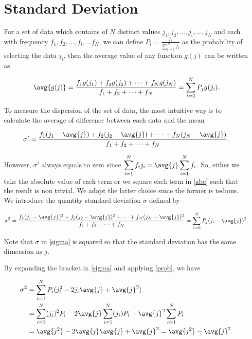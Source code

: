 \documentclass[english,a4paper,12pt]{report}
\begin{document}
\section{Standard Deviation}

For a set of data which contains of \(N\) distinct values \(j_1, j_2, \ldots , j_i, \ldots , j_N\) and each with frequency \(f_1, f_2, \ldots , f_i, \ldots f_N\), we can define \(\displaystyle P_i = \frac{f_i}{\sum_{i=1}^{N} f_i}\) as the probability of selecting the data \(j_i\), then the average value of any function \(g(j)\) can be written as 
	
\begin{equation}
	 \avg{g(j)}  = \frac{f_1 g(j_1) + f_2 g(j_2) + \cdots + f_N g(j_N)}{f_1 + f_2 + \cdots + f_N} = \sum_{i=0}^{N} P_j g(j_i). \label{prob} 
\end{equation}
	
To measure the dispersion of the set of data, the most intuitive way is to calculate the average of difference between each data and the mean

\begin{equation} 
	\sigma' = \frac{f_1(j_1 - \avg{ j }) + f_2(j_2 - \avg{ j }) + \cdots + f_N(j_N - \avg{ j })}{f_1 + f_2 + \cdots + f_N}. \label{abc} 
\end{equation}

However, \(\sigma'\) always equals to zero since \(\displaystyle \sum_{i=1}^{N} f_i j_i = \avg{ j } \sum_{i=1}^{N} f_i \). So, either we take the absolute value of each term or we square each term in \cref{abc} such that the result is non trivial. We adopt the latter choice since the former is tedious. We introduce the quantity standard deviation \(\sigma\) defined by

\begin{equation} 
	\sigma^2 = \frac{f_1(j_1 - \avg{ j })^2 + f_2(j_2 - \avg{ j })^2 + \cdots + f_N(j_N - \avg{ j })^2}{f_1 + f_2 + \cdots + f_N} = \sum_{i=0}^{N} P_j (j_i - \avg{ j })^2. \label{sigma} 
\end{equation}

Note that \(\sigma\) in \cref{sigma} is squared so that the standard deviation has the same dimension as \(j\).

By expanding the bracket in \cref{sigma} and applying \cref{prob}, we have

\begin{equation} 
	\begin{aligned} 
		\sigma^2 &= \sum_{i=1}^{N} P_i (j_i^2 - 2j_i\avg{ j } + \avg{ j }^2) \\ &= \sum_{i=1}^{N} (j_i)^2 P_i - 2 \avg{ j } \sum_{i=1}^{N} (j_i) P_i + \avg{ j }^2 \sum_{i=1}^{N} P_i \\ &= \avg{ j^2 } - 2\avg{ j } \avg{ j } + \avg{ j }^2 = \avg{ j^2 } - \avg{ j }^2. 
	\end{aligned} 
\end{equation}
\end{document}
